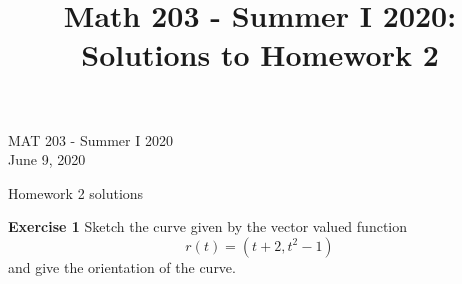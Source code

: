 \documentclass[12pt,oneside]{exam}
\title{Math 203 - Summer I 2020: Solutions to Homework 2}
\newenvironment{exercise}[1]{\vspace{.1in}\noindent\textbf{Exercise #1 \hspace{.05em}}}{}
\begin{document}
\begin{flushright}
\sc MAT 203 - Summer I 2020\\
June 9, 2020
\end{flushright}
\bigskip
 
\begin{center}
\textsf{Homework 2 solutions} 
\end{center}


\begin{exercise}{1}
Sketch the curve given by the vector valued function 
\begin{equation*}
r(t)=(t+2,t^2-1)
\end{equation*}
and give the orientation of the curve.
\end{exercise}
\end{document}
